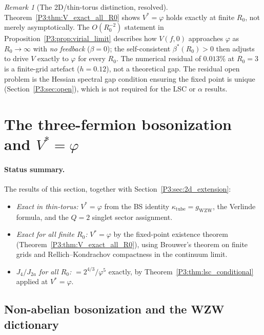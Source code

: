 \documentclass[11pt,a4paper]{article}
\theoremstyle{definition}
\theoremstyle{remark}
\newtheorem{remark}[theorem]{Remark}
\newcommand{\vp}{\varphi}
\newcommand{\bst}{\beta^{*}}
\begin{document}
\begin{remark}[The 2D/thin-torus distinction, resolved]
\label{P3:rem:2d_thintorus_resolved}
Theorem~\ref{P3:thm:V_exact_all_R0} shows $V^* = \vp$ holds exactly at finite $R_0$,
not merely asymptotically.  The $O(R_0^{-2})$ statement in
Proposition~\ref{P3:prop:virial_limit} describes how $V(f,0)$ approaches $\vp$
as $R_0\to\infty$ with \emph{no feedback} ($\beta=0$); the self-consistent
$\bst(R_0) > 0$ then adjusts to drive $V$ exactly to $\vp$ for every $R_0$.
The numerical residual of $0.013\%$ at $R_0=3$ is a finite-grid artefact
($h=0.12$), not a theoretical gap.  The residual open problem is the 
Hessian spectral gap condition ensuring the fixed point is unique
(Section~\ref{P3:sec:open}), which is not required for the LSC or $\alpha$ results.
\end{remark}



\section{The three-fermion bosonization and $V^* = \vp$}
\label{P3:sec:bosonization}

\paragraph{Status summary.}
The results of this section, together with Section~\ref{P3:sec:2d_extension}:
\begin{itemize}[noitemsep]
  \item \emph{Exact in thin-torus:} $V^* = \vp$ from the BS identity
    $\kappa_{\mathrm{tube}} = g_{\mathrm{WZW}}$, the Verlinde formula,
    and the $Q=2$ singlet sector assignment.
  \item \emph{Exact for all finite $R_0$:} $V^* = \vp$ by the
    fixed-point existence theorem (Theorem~\ref{P3:thm:V_exact_all_R0}),
    using Brouwer's theorem on finite grids and Rellich--Kondrachov
    compactness in the continuum limit.
  \item \emph{$J_4/J_{2a}$ for all $R_0$:} $= 2^{4/3}/\vp^5$ exactly,
    by Theorem~\ref{P3:thm:lsc_conditional} applied at $V^* = \vp$.
\end{itemize}

\subsection{Non-abelian bosonization and the WZW dictionary}
\end{document}
